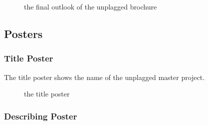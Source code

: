 \begin{figure}[!h]
  \centering
  \caption{the final outlook of the unplagged brochure}
  \label{fig:brochure_sketch}
\end{figure}

\subsection{Posters}

\subsubsection{Title Poster}
The title poster shows the name of the unplagged master project.

\begin{figure}[!h]
  \centering
  \caption{the title poster}
  \label{fig:poster_title}
\end{figure}

\subsubsection{Describing Poster}

